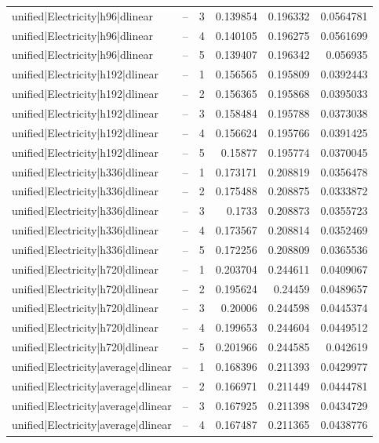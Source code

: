\begin{longtable}{llrrrr}
unified|Electricity|h96|dlinear & -- & 3 & 0.139854 & 0.196332 & 0.0564781 \\
unified|Electricity|h96|dlinear & -- & 4 & 0.140105 & 0.196275 & 0.0561699 \\
unified|Electricity|h96|dlinear & -- & 5 & 0.139407 & 0.196342 & 0.056935 \\
unified|Electricity|h192|dlinear & -- & 1 & 0.156565 & 0.195809 & 0.0392443 \\
unified|Electricity|h192|dlinear & -- & 2 & 0.156365 & 0.195868 & 0.0395033 \\
unified|Electricity|h192|dlinear & -- & 3 & 0.158484 & 0.195788 & 0.0373038 \\
unified|Electricity|h192|dlinear & -- & 4 & 0.156624 & 0.195766 & 0.0391425 \\
unified|Electricity|h192|dlinear & -- & 5 & 0.15877 & 0.195774 & 0.0370045 \\
unified|Electricity|h336|dlinear & -- & 1 & 0.173171 & 0.208819 & 0.0356478 \\
unified|Electricity|h336|dlinear & -- & 2 & 0.175488 & 0.208875 & 0.0333872 \\
unified|Electricity|h336|dlinear & -- & 3 & 0.1733 & 0.208873 & 0.0355723 \\
unified|Electricity|h336|dlinear & -- & 4 & 0.173567 & 0.208814 & 0.0352469 \\
unified|Electricity|h336|dlinear & -- & 5 & 0.172256 & 0.208809 & 0.0365536 \\
unified|Electricity|h720|dlinear & -- & 1 & 0.203704 & 0.244611 & 0.0409067 \\
unified|Electricity|h720|dlinear & -- & 2 & 0.195624 & 0.24459 & 0.0489657 \\
unified|Electricity|h720|dlinear & -- & 3 & 0.20006 & 0.244598 & 0.0445374 \\
unified|Electricity|h720|dlinear & -- & 4 & 0.199653 & 0.244604 & 0.0449512 \\
unified|Electricity|h720|dlinear & -- & 5 & 0.201966 & 0.244585 & 0.042619 \\
unified|Electricity|average|dlinear & -- & 1 & 0.168396 & 0.211393 & 0.0429977 \\
unified|Electricity|average|dlinear & -- & 2 & 0.166971 & 0.211449 & 0.0444781 \\
unified|Electricity|average|dlinear & -- & 3 & 0.167925 & 0.211398 & 0.0434729 \\
unified|Electricity|average|dlinear & -- & 4 & 0.167487 & 0.211365 & 0.0438776 \\

\end{longtable}
